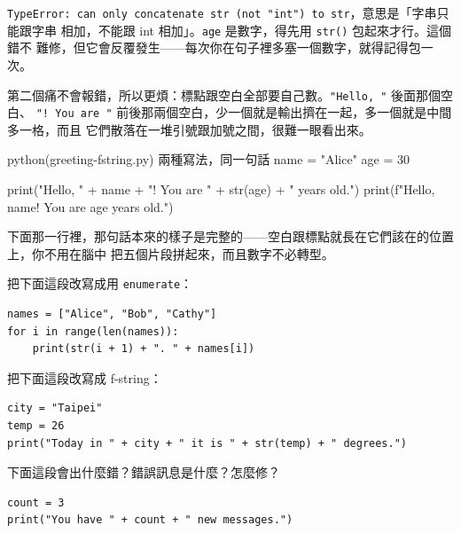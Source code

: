 \texttt{TypeError: can only concatenate str (not "int") to str}，意思是「字串只能跟字串
相加，不能跟 int 相加」。\texttt{age} 是數字，得先用 \texttt{str()} 包起來才行。這個錯不
難修，但它會反覆發生——每次你在句子裡多塞一個數字，就得記得包一次。

第二個痛不會報錯，所以更煩：標點跟空白全部要自己數。\texttt{"Hello, "} 後面那個空白、
\texttt{"! You are "} 前後那兩個空白，少一個就是輸出擠在一起，多一個就是中間多一格，而且
它們散落在一堆引號跟加號之間，很難一眼看出來。

\begin{example}{python}{(greeting-fstring.py) 兩種寫法，同一句話}
name = "Alice"
age = 30

print("Hello, " + name + "! You are " + str(age) + " years old.")
print(f"Hello, {name}! You are {age} years old.")
\end{example}


下面那一行裡，那句話本來的樣子是完整的——空白跟標點就長在它們該在的位置上，你不用在腦中
把五個片段拼起來，而且數字不必轉型。


\begin{drills}[label=drills:value-idioms]
\item 把下面這段改寫成用 \texttt{enumerate}：
\begin{verbatim}
names = ["Alice", "Bob", "Cathy"]
for i in range(len(names)):
    print(str(i + 1) + ". " + names[i])
\end{verbatim}
\item 把下面這段改寫成 f-string：
\begin{verbatim}
city = "Taipei"
temp = 26
print("Today in " + city + " it is " + str(temp) + " degrees.")
\end{verbatim}
\item 下面這段會出什麼錯？錯誤訊息是什麼？怎麼修？
\begin{verbatim}
count = 3
print("You have " + count + " new messages.")
\end{verbatim}
\end{drills}

